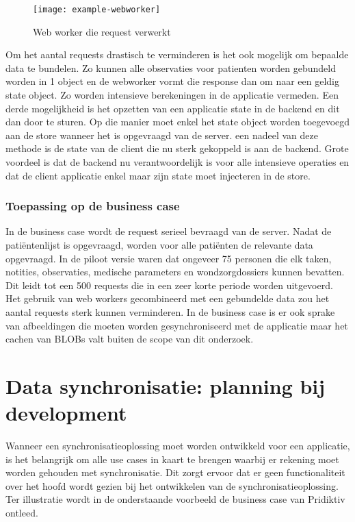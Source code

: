 \begin{figure}[h]
\caption{Web worker die request verwerkt}
\centering
\texttt{[image: example-webworker]}
\end{figure}

Om het aantal requests drastisch te verminderen is het ook mogelijk om bepaalde data te bundelen. Zo kunnen alle observaties voor patienten worden gebundeld worden in 1 object en de webworker vormt die response dan om naar een geldig state object. Zo worden intensieve berekeningen in de applicatie vermeden. Een derde mogelijkheid is het opzetten van een applicatie state in de backend en dit dan door te sturen. Op die manier moet enkel het state object worden toegevoegd aan de store wanneer het is opgevraagd van de server. een nadeel van deze methode is de state van de client die nu sterk gekoppeld is aan de backend. Grote voordeel is dat de backend nu verantwoordelijk is voor alle intensieve operaties en dat de client applicatie enkel maar zijn state moet injecteren in de store.

\subsubsection{Toepassing op de business case}
In de business case wordt de request serieel bevraagd van de server. Nadat de pati\"entenlijst is opgevraagd, worden voor alle pati\"enten de relevante data opgevraagd. In de piloot versie waren dat ongeveer 75 personen die elk taken, notities, observaties, medische parameters en wondzorgdossiers kunnen bevatten. Dit leidt tot een 500 requests die in een zeer korte periode worden uitgevoerd. Het gebruik van web workers \autocite{webworker-reference} gecombineerd met een gebundelde data zou het aantal requests sterk kunnen verminderen. In de business case is er ook sprake van afbeeldingen die moeten worden gesynchroniseerd met de applicatie maar het cachen van BLOBs valt buiten de scope van dit onderzoek.

\section{Data synchronisatie: planning bij development}
Wanneer een synchronisatieoplossing moet worden ontwikkeld voor een applicatie, is het belangrijk om alle use cases in kaart te brengen waarbij er rekening moet worden gehouden met synchronisatie. Dit zorgt ervoor dat er geen functionaliteit over het hoofd wordt gezien bij het ontwikkelen van de synchronisatieoplossing. Ter illustratie wordt in de onderstaande voorbeeld de business case van Pridiktiv ontleed.

